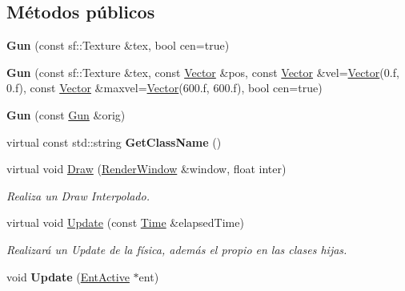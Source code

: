 \subsection*{Métodos públicos}
\begin{DoxyCompactItemize}
\item 
\hypertarget{classGun_add24df19b881b6944193889855490abf}{{\bfseries Gun} (const sf\-::\-Texture \&tex, bool cen=true)}\label{classGun_add24df19b881b6944193889855490abf}

\item 
\hypertarget{classGun_a17f769accaa9ad556047c628f00d9ad6}{{\bfseries Gun} (const sf\-::\-Texture \&tex, const \hyperlink{classVector}{Vector} \&pos, const \hyperlink{classVector}{Vector} \&vel=\hyperlink{classVector}{Vector}(0.f, 0.f), const \hyperlink{classVector}{Vector} \&maxvel=\hyperlink{classVector}{Vector}(600.f, 600.f), bool cen=true)}\label{classGun_a17f769accaa9ad556047c628f00d9ad6}

\item 
\hypertarget{classGun_a1e2c6e1776c3fe89592c012e020a6566}{{\bfseries Gun} (const \hyperlink{classGun}{Gun} \&orig)}\label{classGun_a1e2c6e1776c3fe89592c012e020a6566}

\item 
\hypertarget{classGun_a307c86c4feba903cd9672e17cb2d45f6}{virtual const std\-::string {\bfseries Get\-Class\-Name} ()}\label{classGun_a307c86c4feba903cd9672e17cb2d45f6}

\item 
virtual void \hyperlink{classGun_a70271085b85f4cfa2cf8e74975e7fef9}{Draw} (\hyperlink{classRenderWindow}{Render\-Window} \&window, float inter)
\begin{DoxyCompactList}\small\item\em Realiza un Draw Interpolado. \end{DoxyCompactList}\item 
\hypertarget{classGun_a888633a4af0a2d136ef2c366794d1544}{virtual void \hyperlink{classGun_a888633a4af0a2d136ef2c366794d1544}{Update} (const \hyperlink{classTime}{Time} \&elapsed\-Time)}\label{classGun_a888633a4af0a2d136ef2c366794d1544}

\begin{DoxyCompactList}\small\item\em Realizará un Update de la física, además el propio en las clases hijas. \end{DoxyCompactList}\item 
\hypertarget{classGun_af7bb838648ada8d4d730d3966264260f}{void {\bfseries Update} (\hyperlink{classEntActive}{Ent\-Active} $\ast$ent)}\label{classGun_af7bb838648ada8d4d730d3966264260f}


\end{DoxyCompactItemize}
